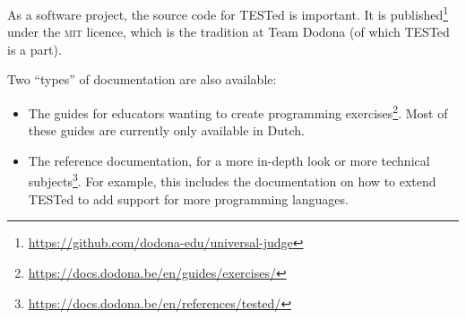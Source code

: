 \documentclass[./main]{subfiles}
\begin{document}
As a software project, the source code for TESTed is important.
It is published\footnote{\url{https://github.com/dodona-edu/universal-judge}} under the \textsc{mit} licence, which is the tradition at Team Dodona (of which TESTed is a part).

Two ``types'' of documentation are also available:

\begin{itemize}
    \item The guides for educators wanting to create programming exercises\footnote{\url{https://docs.dodona.be/en/guides/exercises/}}.
          Most of these guides are currently only available in Dutch.
    \item The reference documentation, for a more in-depth look or more technical subjects\footnote{\url{https://docs.dodona.be/en/references/tested/}}.
          For example, this includes the documentation on how to extend TESTed to add support for more programming languages.
\end{itemize}
\end{document}
